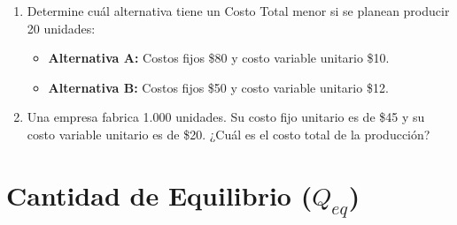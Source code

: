 \documentclass[12pt,a4paper]{article}
\newcommand{\answerspace}{\vspace{4.5cm}}
\newcommand{\lastanswerspace}{\vspace{2cm}}
\begin{document}
\begin{enumerate}[label=\textbf{\arabic*.}, leftmargin=*, itemsep=0pt]
\item Determine cuál alternativa tiene un Costo Total menor si se planean producir 20 unidades:
  \begin{itemize}
    \item \textbf{Alternativa A:} Costos fijos \$80 y costo variable unitario \$10.
    \item \textbf{Alternativa B:} Costos fijos \$50 y costo variable unitario \$12.
  \end{itemize}
\answerspace

\item Una empresa fabrica 1.000 unidades. Su costo fijo unitario es de \$45 y su costo variable unitario es de \$20. ¿Cuál es el costo total de la producción?
\lastanswerspace

\end{enumerate}

\newpage

\section{Cantidad de Equilibrio ($Q_{eq}$)}
\end{document}
